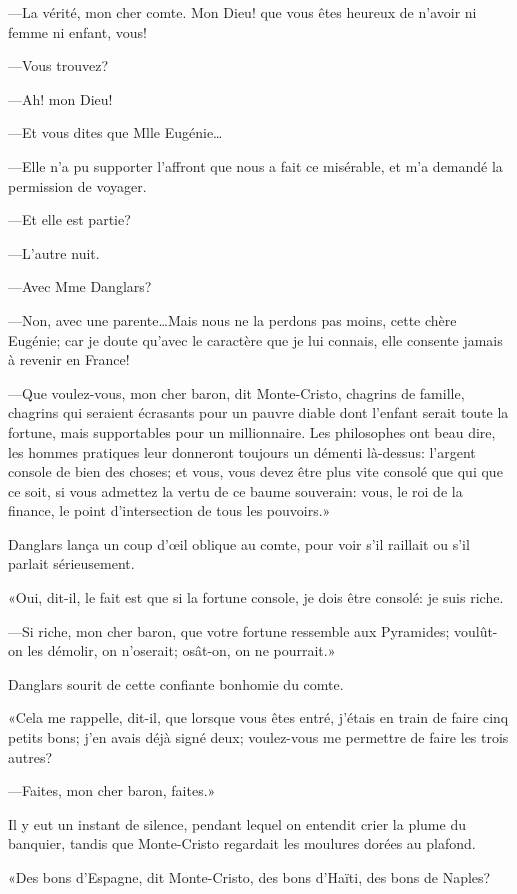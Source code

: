 —La vérité, mon cher comte. Mon Dieu! que vous êtes heureux de n'avoir ni femme ni enfant, vous! 

—Vous trouvez? 

—Ah! mon Dieu! 

—Et vous dites que Mlle Eugénie\dots 

—Elle n'a pu supporter l'affront que nous a fait ce misérable, et m'a demandé la permission de voyager. 

—Et elle est partie? 

—L'autre nuit. 

—Avec Mme Danglars? 

—Non, avec une parente\dots Mais nous ne la perdons pas moins, cette chère Eugénie; car je doute qu'avec le caractère que je lui connais, elle consente jamais à revenir en France! 

—Que voulez-vous, mon cher baron, dit Monte-Cristo, chagrins de famille, chagrins qui seraient écrasants pour un pauvre diable dont l'enfant serait toute la fortune, mais supportables pour un millionnaire. Les philosophes ont beau dire, les hommes pratiques leur donneront toujours un démenti là-dessus: l'argent console de bien des choses; et vous, vous devez être plus vite consolé que qui que ce soit, si vous admettez la vertu de ce baume souverain: vous, le roi de la finance, le point d'intersection de tous les pouvoirs.» 

Danglars lança un coup d'œil oblique au comte, pour voir s'il raillait ou s'il parlait sérieusement. 

«Oui, dit-il, le fait est que si la fortune console, je dois être consolé: je suis riche. 

—Si riche, mon cher baron, que votre fortune ressemble aux Pyramides; voulût-on les démolir, on n'oserait; osât-on, on ne pourrait.» 

Danglars sourit de cette confiante bonhomie du comte. 

«Cela me rappelle, dit-il, que lorsque vous êtes entré, j'étais en train de faire cinq petits bons; j'en avais déjà signé deux; voulez-vous me permettre de faire les trois autres? 

—Faites, mon cher baron, faites.» 

Il y eut un instant de silence, pendant lequel on entendit crier la plume du banquier, tandis que Monte-Cristo regardait les moulures dorées au plafond. 

«Des bons d'Espagne, dit Monte-Cristo, des bons d'Haïti, des bons de Naples? 

